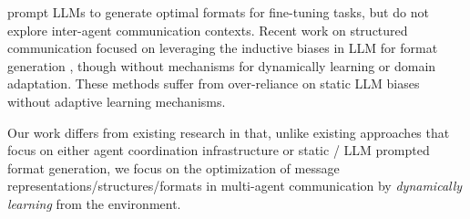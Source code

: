 \cite{yuan2023structured} prompt LLMs to generate optimal formats for fine-tuning tasks, but do not explore inter-agent communication contexts.
Recent work on structured communication focused on leveraging the inductive biases in LLM for format generation \cite{chen2022program}, though without mechanisms for dynamically learning or domain adaptation. These methods suffer from over-reliance on static LLM biases without adaptive learning mechanisms.

Our work differs from existing research in that, unlike existing approaches that focus on either agent coordination infrastructure or static / LLM prompted format generation, we focus on the optimization of message representations/structures/formats in multi-agent communication by \emph{dynamically learning} from the environment.

